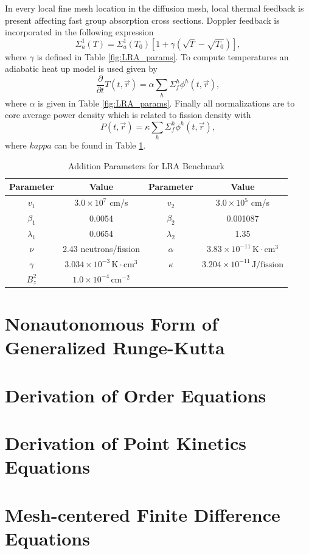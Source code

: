 \documentclass{ansconf}
\numberwithin{equation}{section}
\begin{document}
In every local fine mesh location in the diffusion mesh, local thermal feedback is present affecting fast group absorption cross sections. Doppler feedback is incorporated in the following expression
\begin{equation}
    \Sigma_a^1\left(T\right) = \Sigma_a^1\left(T_0\right)\left[1 + \gamma\left(\sqrt{T} - \sqrt{T_0}\right)\right],
\end{equation}
where $\gamma$ is defined in Table \ref{fig:LRA_params}. To compute temperatures an adiabatic heat up model is used given by
\begin{equation}
    \frac{\partial}{\partial t} T\left(t,\vec{r}\right) = \alpha\sum_h\Sigma_f^h\phi^h\left(t,\vec{r}\right),
\end{equation}
where $\alpha$ is given in Table \ref{fig:LRA_params}. Finally all normalizations are to core average power density which is related to fission density with
\begin{equation}
    P\left(t,\vec{r}\right) = \kappa\sum_h\Sigma_f^h\phi^h\left(t,\vec{r}\right),
\end{equation}
where $kappa$ can be found in Table \ref{tab:LRA_params}. 
\begin{table}
\centering
\caption{Addition Parameters for LRA Benchmark}
\label{tab:LRA_params}
\begin{tabular}{cc||cc}
\toprule 
Parameter & Value & Parameter & Value\tabularnewline
\midrule
\midrule 
$v_{1}$ & $3.0\times10^{7}$ cm/s & $v_{2}$ & $3.0\times10^{5}$ cm/s\tabularnewline
\midrule 
$\beta_{1}$ & 0.0054 & $\beta_{2}$ & 0.001087\tabularnewline
\midrule 
$\lambda_{1}$ & 0.0654 & $\lambda_{2}$ & 1.35\tabularnewline
\midrule 
$\nu$ & 2.43 neutrons/fission & $\alpha$ & $3.83\times10^{-11}\,\mathrm{K\cdot cm^{3}}$\tabularnewline
\midrule 
$\gamma$  & $3.034\times10^{-3}\,\mathrm{K\cdot cm^{3}}$ & $\kappa$  & $3.204\times10^{-11}\,\mathrm{J/fission}$\tabularnewline
\midrule 
$B_{z}^{2}$ & $1.0\times10^{-4}\,\mathrm{cm^{-2}}$ &  & \tabularnewline
\bottomrule
\end{tabular}
\end{table}


\setlength{\baselineskip}{12pt}




\appendix

\section{Nonautonomous Form of Generalized Runge-Kutta}

\section{Derivation of Order Equations}

\section{Derivation of Point Kinetics Equations} \label{app:pkes}

\section{Mesh-centered Finite Difference Equations} \label{app:fdm}
\end{document}
